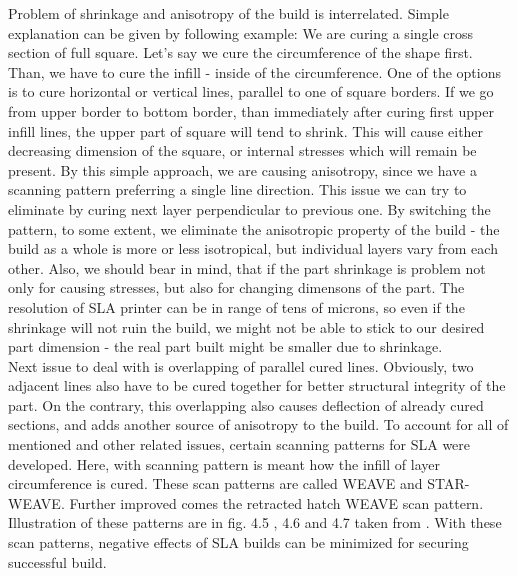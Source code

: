 \documentclass[a4paper, twoside, 11pt]{report}
\begin{document}
Problem of shrinkage and anisotropy of the build is interrelated. Simple explanation can be given by following example: We are curing a single cross section of full square. Let's say we cure the circumference of the shape first. Than, we have to cure the infill - inside of the circumference. One of the options is to cure horizontal or vertical lines, parallel to one of square borders. If we go from upper border to bottom border, than immediately after curing first upper infill lines, the upper part of square will tend to shrink. This will cause either decreasing dimension of the square, or internal stresses which will remain be present.  By this simple approach, we are causing anisotropy, since we have a scanning pattern preferring a single line direction. This issue we can try to eliminate by curing next layer perpendicular to previous one. By switching the pattern, to some extent, we eliminate the anisotropic property of the build - the build as a whole is more or less isotropical, but individual layers vary from each other. Also, we should bear in mind, that if the part shrinkage is problem not only for causing stresses, but also for changing dimensons of the part. The resolution of SLA printer can be in range of tens of microns, so even if the shrinkage will not ruin the build, we might not be able to stick to our desired part dimension - the real part built might be smaller due to shrinkage.\\
Next issue to deal with is overlapping of parallel cured lines. Obviously, two adjacent lines also have to be cured together for better structural integrity of the part. On the contrary, this overlapping also causes deflection of already cured sections, and adds another source of anisotropy to the build.
To account for all of mentioned and other related issues, certain scanning patterns for SLA were developed. Here, with scanning pattern is meant how the infill of layer circumference is cured. These scan patterns are called WEAVE and STAR-WEAVE. Further improved comes the retracted hatch WEAVE scan pattern. Illustration of these patterns are in fig. 4.5 , 4.6 and 4.7 taken from \cite{AMT}. With these scan patterns, negative effects of SLA builds can be minimized for securing successful build.

%
\end{document}
